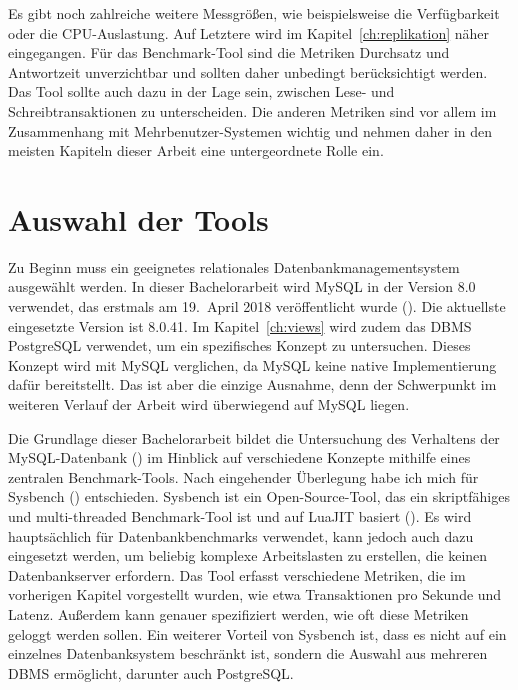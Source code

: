 Es gibt noch zahlreiche weitere Messgrößen, wie beispielsweise die Verfügbarkeit oder die CPU-Auslastung.
Auf Letztere wird im Kapitel~\ref{ch:replikation} näher eingegangen.
Für das Benchmark-Tool sind die Metriken Durchsatz und Antwortzeit unverzichtbar und sollten daher unbedingt berücksichtigt werden.
Das Tool sollte auch dazu in der Lage sein, zwischen Lese- und Schreibtransaktionen zu unterscheiden.
Die anderen Metriken sind vor allem im Zusammenhang mit Mehrbenutzer-Systemen wichtig und nehmen daher in den meisten Kapiteln dieser Arbeit eine untergeordnete Rolle ein.

\section{Auswahl der Tools}\label{sec:auswahl-der-tools}

Zu Beginn muss ein geeignetes relationales Datenbankmanagementsystem ausgewählt werden.
In dieser Bachelorarbeit wird MySQL in der Version 8.0 verwendet, das erstmals am 19.\ April 2018 veröffentlicht wurde (\cite{mysql_release}).
Die aktuellste eingesetzte Version ist 8.0.41.
Im Kapitel~\ref{ch:views} wird zudem das DBMS PostgreSQL verwendet, um ein spezifisches Konzept zu untersuchen.
Dieses Konzept wird mit MySQL verglichen, da MySQL keine native Implementierung dafür bereitstellt.
Das ist aber die einzige Ausnahme, denn der Schwerpunkt im weiteren Verlauf der Arbeit wird überwiegend auf MySQL liegen.

Die Grundlage dieser Bachelorarbeit bildet die Untersuchung des Verhaltens der MySQL-Datenbank (\cite{sysbench_mysql}) im Hinblick auf verschiedene Konzepte mithilfe eines zentralen Benchmark-Tools.
Nach eingehender Überlegung habe ich mich für Sysbench (\cite{sysbench_repo}) entschieden.
Sysbench ist ein Open-Source-Tool, das ein skriptfähiges und multi-threaded Benchmark-Tool ist und auf LuaJIT basiert (\cite[S. 50--66]{schwartz2012high}).
Es wird hauptsächlich für Datenbankbenchmarks verwendet, kann jedoch auch dazu eingesetzt werden, um beliebig komplexe Arbeitslasten zu erstellen, die keinen Datenbankserver erfordern.
Das Tool erfasst verschiedene Metriken, die im vorherigen Kapitel vorgestellt wurden, wie etwa Transaktionen pro Sekunde und Latenz.
Außerdem kann genauer spezifiziert werden, wie oft diese Metriken geloggt werden sollen.
Ein weiterer Vorteil von Sysbench ist, dass es nicht auf ein einzelnes Datenbanksystem beschränkt ist, sondern die Auswahl aus mehreren DBMS ermöglicht, darunter auch PostgreSQL\@.

